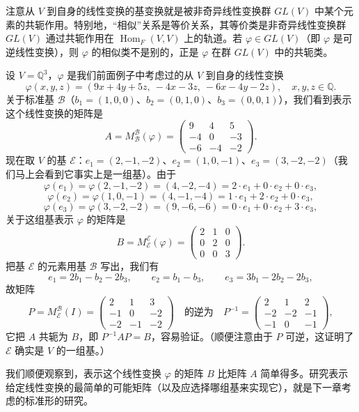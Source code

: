 注意从 \(V\) 到自身的线性变换的基变换就是被非奇异线性变换群 \(GL(V)\) 中某个元素的共轭作用。特别地，“相似”关系是等价关系，其等价类是非奇异线性变换群 \(GL(V)\) 通过共轭作用在 \(\operatorname{Hom}_F(V, V)\) 上的轨道。若 \(\varphi \in GL(V)\)（即 \(\varphi\) 是可逆线性变换），则 \(\varphi\) 的相似类不是别的，正是 \(\varphi\) 在群 \(GL(V)\) 中的共轭类。

\begin{example}
设 \(V = \mathbb{Q}^3\)，\(\varphi\) 是我们前面例子中考虑过的从 \(V\) 到自身的线性变换
\[
\varphi(x, y, z) = (9x+4y+5z,\ -4x-3z,\ -6x-4y-2z), \quad x, y, z \in \mathbb{Q}.
\]
关于标准基 \(\mathcal{B}\)（\(b_1 = (1, 0, 0)\)、\(b_2 = (0, 1, 0)\)、\(b_3 = (0, 0, 1)\)），我们看到表示这个线性变换的矩阵是
\[
A = M_{\mathcal{B}}^{\mathcal{B}}(\varphi) = \begin{pmatrix} 9 & 4 & 5 \\ -4 & 0 & -3 \\ -6 & -4 & -2 \end{pmatrix}.
\]
现在取 \(V\) 的基 \(\mathcal{E}\)：\(e_1 = (2, -1, -2)\)、\(e_2 = (1, 0, -1)\)、\(e_3 = (3, -2, -2)\)（我们马上会看到它事实上是一组基）。由于
\[
\varphi(e_1) = \varphi(2, -1, -2) = (4, -2, -4) = 2 \cdot e_1+0 \cdot e_2+0 \cdot e_3,
\]
\[
\varphi(e_2) = \varphi(1, 0, -1) = (4, -1, -4) = 1 \cdot e_1+2 \cdot e_2+0 \cdot e_3,
\]
\[
\varphi(e_3) = \varphi(3, -2, -2) = (9, -6, -6) = 0 \cdot e_1+0 \cdot e_2+3 \cdot e_3,
\]
关于这组基表示 \(\varphi\) 的矩阵是
\[
B = M_{\mathcal{E}}^{\mathcal{E}}(\varphi) = \begin{pmatrix} 2 & 1 & 0 \\ 0 & 2 & 0 \\ 0 & 0 & 3 \end{pmatrix}.
\]
把基 \(\mathcal{E}\) 的元素用基 \(\mathcal{B}\) 写出，我们有
\[
e_1 = 2b_1-b_2-2b_3, \qquad e_2 = b_1-b_3, \qquad e_3 = 3b_1-2b_2-2b_3,
\]
故矩阵
\[
P = M_{\mathcal{E}}^{\mathcal{B}}(I) = \begin{pmatrix} 2 & 1 & 3 \\ -1 & 0 & -2 \\ -2 & -1 & -2 \end{pmatrix} \quad \text{的逆为} \quad P^{-1} = \begin{pmatrix} 2 & 1 & 2 \\ -2 & -2 & -1 \\ -1 & 0 & -1 \end{pmatrix},
\]
它把 \(A\) 共轭为 \(B\)，即 \(P^{-1}AP = B\)，容易验证。（顺便注意由于 \(P\) 可逆，这证明了 \(\mathcal{E}\) 确实是 \(V\) 的一组基。）

我们顺便观察到，表示这个线性变换 \(\varphi\) 的矩阵 \(B\) 比矩阵 \(A\) 简单得多。研究表示给定线性变换的最简单的可能矩阵（以及应选择哪组基来实现它），就是下一章考虑的标准形的研究。
\end{example}


